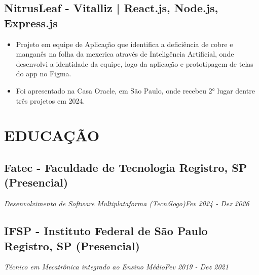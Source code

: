 \documentclass[a4paper,10pt]{article}
\begin{document}
    \subsection*{\texorpdfstring{
            \textbf{NitrusLeaf - Vitalliz  | React.js, Node.js, Express.js } 
        }{
            Nome da Empresa -- Localização
        }}  
        \begin{itemize} 
            \item Projeto em equipe de Aplicação que identifica a deficiência de cobre e manganês na folha da mexerica através de Inteligência Artificial, onde desenvolvi a identidade da equipe, logo da aplicação e prototipagem de telas do app no Figma.
            \item Foi apresentado na Casa Oracle, em São Paulo, onde recebeu 2° lugar dentre três projetos em 2024.
        
        
        \end{itemize}

\section{EDUCAÇÃO}
    \subsection*{\texorpdfstring{
            \textbf{Fatec - Faculdade de Tecnologia} \hfill Registro, SP (Presencial)
        }{
            Fatec Registro (Educação) -- Localização
        }}
    \textit{Desenvolvimento de Software Multiplataforma (Tecnólogo)\hfill Fev 2024 - Dez 2026}

    \subsection*{\texorpdfstring{
            \textbf{IFSP - Instituto Federal de São Paulo} \hfill Registro, SP (Presencial)
        }{
            IFSP Registro (Educação) -- Localização
        }}
    \textit{Técnico em Mecatrônica integrado ao Ensino Médio\hfill Fev 2019 - Dez 2021}
\end{document}
